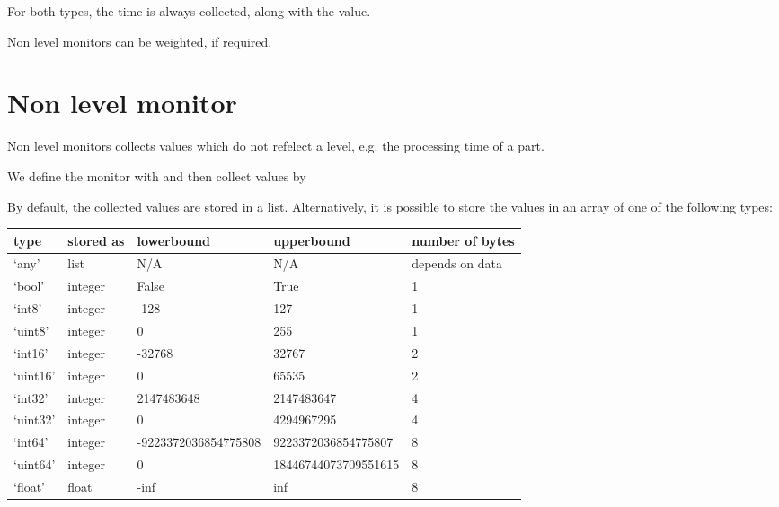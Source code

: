 \documentclass[letterpaper,10pt,english]{sphinxmanual}
\begin{document}
For both types, the time is always collected, along with the value.

Non level monitors can be weighted, if required.


\section{Non level monitor}
\label{\detokenize{Monitor:non-level-monitor}}
Non level monitors collects values which do not refelect a level, e.g. the processing time of a part.

We define the monitor with  and then
collect values by 

By default, the collected values are stored in a list. Alternatively, it is possible to store
the values in an array of one of the following types:


\begin{savenotes}\sphinxattablestart
\centering
\begin{tabulary}{\linewidth}[t]{|T|T|T|T|T|}
\hline
\sphinxstyletheadfamily 
type
&\sphinxstyletheadfamily 
stored as
&\sphinxstyletheadfamily 
lowerbound
&\sphinxstyletheadfamily 
upperbound
&\sphinxstyletheadfamily 
number of bytes
\\
\hline
‘any’
&
list
&
N/A
&
N/A
&
depends on data
\\
\hline
‘bool’
&
integer
&
False
&
True
&
1
\\
\hline
‘int8’
&
integer
&
-128
&
127
&
1
\\
\hline
‘uint8’
&
integer
&
0
&
255
&
1
\\
\hline
‘int16’
&
integer
&
-32768
&
32767
&
2
\\
\hline
‘uint16’
&
integer
&
0
&
65535
&
2
\\
\hline
‘int32’
&
integer
&
2147483648
&
2147483647
&
4
\\
\hline
‘uint32’
&
integer
&
0
&
4294967295
&
4
\\
\hline
‘int64’
&
integer
&
-9223372036854775808
&
9223372036854775807
&
8
\\
\hline
‘uint64’
&
integer
&
0
&
18446744073709551615
&
8
\\
\hline
‘float’
&
float
&
-inf
&
inf
&
8
\\
\hline
\end{tabulary}
\par
\sphinxattableend\end{savenotes}
\end{document}

